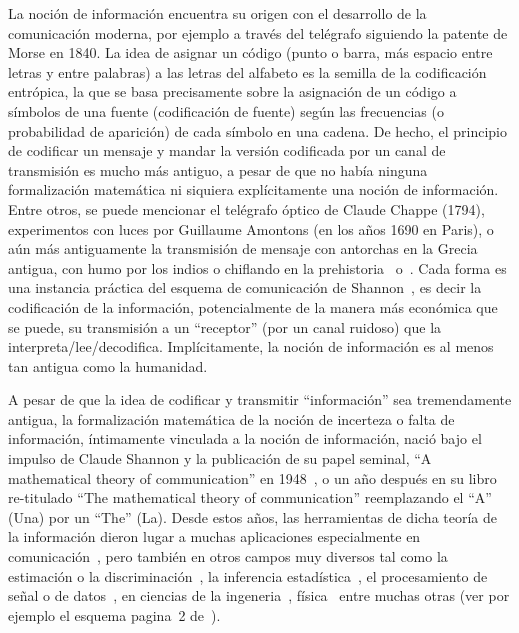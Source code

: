 \label{Sec:SZ:Introduccion}

La  noci\'on  de informaci\'on  encuentra  su origen  con  el  desarrollo de  la
comunicaci\'on  moderna, por  ejemplo a  trav\'es del  tel\'egrafo  siguiendo la
patente de Morse en  1840. La idea de asignar un c\'odigo  (punto o barra, m\'as
espacio entre letras  y entre palabras) a las letras del  alfabeto es la semilla
de  la  codificaci\'on  entr\'opica,  la  que  se  basa  precisamente  sobre  la
asignaci\'on  de un  c\'odigo  a  s\'imbolos de  una  fuente (codificaci\'on  de
fuente)  seg\'un  las  frecuencias  (o  probabilidad  de  aparici\'on)  de  cada
s\'imbolo  en una  cadena.  De  hecho, el  principio de  codificar un  mensaje y
mandar  la versi\'on codificada  por un  canal de  transmisi\'on es  mucho m\'as
antiguo,  a pesar  de que  no  hab\'ia ninguna  formalizaci\'on matem\'atica  ni
siquiera expl\'icitamente una noci\'on  de informaci\'on.  Entre otros, se puede
mencionar  el tel\'egrafo  \'optico de  Claude Chappe  (1794),  experimentos con
luces  por Guillaume  Amontons (en  los  a\~nos 1690  en Paris),  o a\'un  m\'as
antiguamente la transmisi\'on de mensaje con antorchas en la Grecia antigua, con
humo   por    los   indios   o   chiflando    en   la   prehistoria~\cite{Mon08}
o~\cite[Cap.~3]{Arn01}.  Cada  forma es una instancia pr\'actica  del esquema de
comunicaci\'on de Shannon~\cite{Sha48, ShaWea64},  es decir la codificaci\'on de
la informaci\'on, potencialmente de la manera m\'as econ\'omica que se puede, su
transmisi\'on   a   un   ``receptor''    (por   un   canal   ruidoso)   que   la
interpreta/lee/decodifica.  Impl\'icitamente, la noci\'on de informaci\'on es al
menos tan antigua como la humanidad.

A  pesar  de  que  la  idea  de codificar  y  transmitir  ``informaci\'on''  sea
tremendamente  antigua,  la  formalizaci\'on  matem\'atica  de  la  noci\'on  de
incerteza o  falta de  informaci\'on, \'intimamente vinculada  a la  noci\'on de
informaci\'on, naci\'o bajo  el impulso de Claude Shannon  y la publicaci\'on de
su   papel   seminal,   ``A    mathematical   theory   of   communication''   en
1948~\cite{Sha48},  o   un  a\~no  despu\'es  en  su   libro  re-titulado  ``The
mathematical  theory  of communication''  reemplazando  el  ``A''  (Una) por  un
``The''  (La). Desde  estos a\~nos,  las herramientas  de dicha  teor\'ia  de la
informaci\'on   dieron   lugar    a   muchas   aplicaciones   especialmente   en
comunicaci\'on~\cite[y  ref.]{CovTho06, Ver98, Gal01},  pero tambi\'en  en otros
campos  muy diversos  tal  como la  estimaci\'on  o la  discriminaci\'on~\cite[y
ref.]{CovTho06,      Kay93,       Bos07,      LehCas98},      la      inferencia
estad\'istica~\cite{Rob07,   Par06},   el   procesamiento   de  se\~nal   o   de
datos~\cite[y   Ref.]{PhiRou92,   EbeMol00,    Bas13},   en   ciencias   de   la
ingeneria~\cite{Arn01, Kap89, KapKes92, PhiRou92}, f\'isica~\cite[y Ref.]{Arn01,
OhyPet93,  Mer18}  entre muchas  otras  (ver  por  ejemplo el  esquema  pagina~2
de~\cite{CovTho06}).

